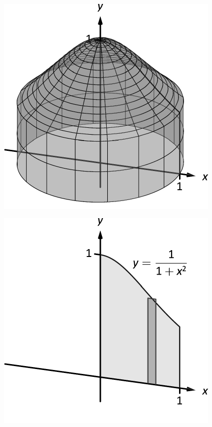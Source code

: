 \documentclass[10pt]{article}
\begin{document}
\includegraphics{figshell_intro_a_3DBW.pdf}
\texttt{}

\includegraphics{figshell_intro_b_3DBW.pdf}
\texttt{}
\end{document}
